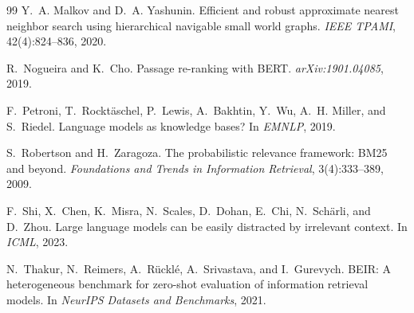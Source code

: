 \documentclass[11pt,a4paper]{article}
\begin{document}
\begin{thebibliography}{99}
Y.~A. Malkov and D.~A. Yashunin.
\newblock Efficient and robust approximate nearest neighbor search using
  hierarchical navigable small world graphs.
\newblock \emph{IEEE TPAMI}, 42(4):824--836, 2020.

R.~Nogueira and K.~Cho.
\newblock Passage re-ranking with BERT.
\newblock \emph{arXiv:1901.04085}, 2019.

F.~Petroni, T.~Rocktäschel, P.~Lewis, A.~Bakhtin, Y.~Wu, A.~H. Miller, and
  S.~Riedel.
\newblock Language models as knowledge bases?
\newblock In \emph{EMNLP}, 2019.

S.~Robertson and H.~Zaragoza.
\newblock The probabilistic relevance framework: BM25 and beyond.
\newblock \emph{Foundations and Trends in Information Retrieval},
  3(4):333--389, 2009.

F.~Shi, X.~Chen, K.~Misra, N.~Scales, D.~Dohan, E.~Chi, N.~Schärli, and
  D.~Zhou.
\newblock Large language models can be easily distracted by irrelevant
  context.
\newblock In \emph{ICML}, 2023.

N.~Thakur, N.~Reimers, A.~Rücklé, A.~Srivastava, and I.~Gurevych.
\newblock BEIR: A heterogeneous benchmark for zero-shot evaluation of
  information retrieval models.
\newblock In \emph{NeurIPS Datasets and Benchmarks}, 2021.

\end{thebibliography}
\end{document}
